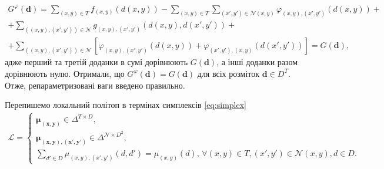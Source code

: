 \begin{equation*}
\begin{gathered}
    G^{\varphi} \left( \pmb{d} \right)
    = \sum \limits_{\left(x, y \right) \in T}
        f_{\left(x, y \right)} \left(d \left(x, y \right) \right)
    - \sum \limits_{\left(x, y \right) \in T}
        \sum \limits_{\left(x', y' \right) \in \mathcal{N} \left(x, y \right)}
            \varphi_{\left(x, y \right), \left(x', y' \right)} \left(
                d \left(x, y \right)
            \right) + \\
    + \sum \limits_{\left( \left(x, y \right), \left( x', y' \right) \right) \in \mathcal{N}}
        g_{\left(x, y \right), \left(x', y' \right)} \left(
            d \left(x, y \right), d \left(x', y' \right)
        \right) + \\
    + \sum \limits_{\left( \left(x, y \right), \left( x', y' \right) \right) \in \mathcal{N}}
        \left[
            \varphi_{\left(x, y \right), \left(x', y' \right)} \left(
                d \left(x, y \right)
            \right)
            + \varphi_{\left(x', y' \right), \left(x, y \right)} \left(
                d \left(x', y' \right)
            \right)
        \right] = G \left(\pmb{d} \right),
\end{gathered}
\end{equation*}
адже перший та третій доданки в сумі дорівнюють
$G \left( \pmb{d} \right)$,
а інші доданки разом дорівнюють нулю.
Отримали, що
$G^{\varphi} \left(\pmb{d} \right)
    = G \left(\pmb{d} \right)$
для всіх розміток $\pmb{d} \in D^T$.
Отже, репараметризовані ваги введено правильно.

Перепишемо локальний політоп в термінах симплексів \eqref{eq:simplex}
\begin{equation*}
\begin{gathered}
    \mathcal{L} =
    \begin{cases}
        \pmb{\mu_{\left(x, y \right)}} \in \Delta^{T \times D}, \\
        \pmb{\mu_{ \left(x, y \right), \left(x', y' \right)}} \in
            \Delta^{\mathcal{N} \times D^2}, \\
        \sum \limits_{d' \in D}
            \mu_{\left(x, y \right), \left(x', y' \right)} \left(d, d' \right) =
            \mu_{\left(x, y \right)} \left(d \right), \,
        \forall \left(x, y \right) \in T,
        \left(x', y' \right) \in \mathcal{N} \left(x, y \right),
        d \in D.
    \end{cases}
\end{gathered}
\end{equation*}


